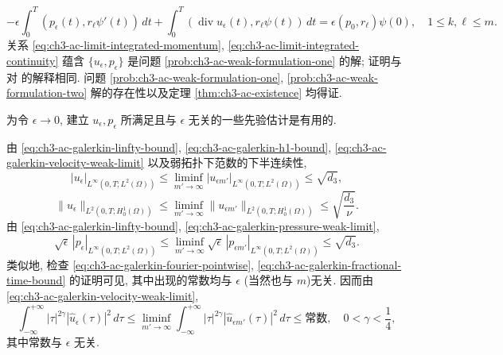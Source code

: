 \begin{Proof}
\begin{equation}
-\epsilon\int_0^T(p_\epsilon(t),r_\ell\psi'(t))\,dt
+\int_0^T(\operatorname{div}u_\epsilon(t),r_\ell\psi(t))\,dt
=\epsilon(p_0,r_\ell)\psi(0),
\quad1\leq k,\ell\leq m.
\label{eq:ch3-ac-limit-integrated-continuity}
\end{equation}
关系 \eqref{eq:ch3-ac-limit-integrated-momentum}, \eqref{eq:ch3-ac-limit-integrated-continuity} 蕴含 $\{u_\epsilon,p_\epsilon\}$ 是问题 \ref{prob:ch3-ac-weak-formulation-one} 的解; 证明与对  的解释相同. 问题 \ref{prob:ch3-ac-weak-formulation-one}, \ref{prob:ch3-ac-weak-formulation-two} 解的存在性以及定理 \ref{thm:ch3-ac-existence} 均得证.
\end{Proof}

\begin{Remark}
\label{rem:ch3-ac-epsilon-independent-estimates}
为令 $\epsilon\to0$, 建立 $u_\epsilon,p_\epsilon$ 所满足且与 $\epsilon$ 无关的一些先验估计是有用的.

\hypertarget{chapter-03-page-310}{}
由 \eqref{eq:ch3-ac-galerkin-linfty-bound}, \eqref{eq:ch3-ac-galerkin-h1-bound}, \eqref{eq:ch3-ac-galerkin-velocity-weak-limit} 以及弱拓扑下范数的下半连续性,
\begin{equation}
|u_\epsilon|_{L^\infty(0,T;L^2(\Omega))}
\leq\liminf_{m'\to\infty}
|u_{\epsilon m'}|_{L^\infty(0,T;L^2(\Omega))}
\leq\sqrt{d_3},
\label{eq:ch3-ac-epsilon-velocity-linfty}
\end{equation}
\begin{equation}
\lVert u_\epsilon\rVert_{L^2(0,T;H_0^1(\Omega))}
\leq\liminf_{m'\to\infty}
\lVert u_{\epsilon m'}\rVert_{L^2(0,T;H_0^1(\Omega))}
\leq\sqrt{\frac{d_3}{\nu}}.
\label{eq:ch3-ac-epsilon-velocity-h1}
\end{equation}
由 \eqref{eq:ch3-ac-galerkin-linfty-bound}, \eqref{eq:ch3-ac-galerkin-pressure-weak-limit},
\begin{equation}
\sqrt\epsilon\,|p_\epsilon|_{L^\infty(0,T;L^2(\Omega))}
\leq\liminf_{m'\to\infty}
\sqrt\epsilon\,|p_{\epsilon m'}|_{L^\infty(0,T;L^2(\Omega))}
\leq\sqrt{d_3}.
\label{eq:ch3-ac-epsilon-pressure-linfty}
\end{equation}
类似地, 检查 \eqref{eq:ch3-ac-galerkin-fourier-pointwise}, \eqref{eq:ch3-ac-galerkin-fractional-time-bound} 的证明可见, 其中出现的常数均与 $\epsilon$ (当然也与 $m$)无关. 因而由 \eqref{eq:ch3-ac-galerkin-velocity-weak-limit},
\begin{equation}
\int_{-\infty}^{+\infty}|\tau|^{2\gamma}
|\widehat u_\epsilon(\tau)|^2\,d\tau
\leq\liminf_{m'\to\infty}
\int_{-\infty}^{+\infty}|\tau|^{2\gamma}
|\widehat u_{\epsilon m'}(\tau)|^2\,d\tau
\leq\text{常数},
\quad0<\gamma<\frac14,
\label{eq:ch3-ac-epsilon-fractional-time}
\end{equation}
其中常数与 $\epsilon$ 无关.
\end{Remark}

